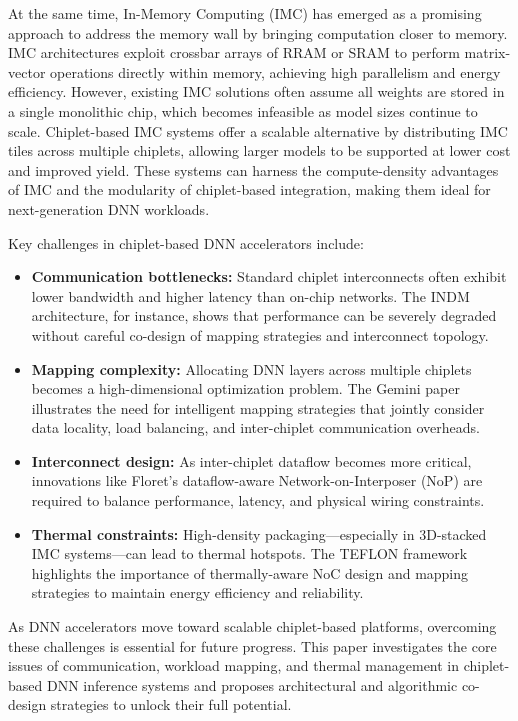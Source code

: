 \documentclass[acmsmall]{acmart}
\begin{document}
At the same time, In-Memory Computing (IMC) has emerged as a promising approach to address the memory wall by bringing computation closer to memory. IMC architectures exploit crossbar arrays of RRAM or SRAM to perform matrix-vector operations directly within memory, achieving high parallelism and energy efficiency. However, existing IMC solutions often assume all weights are stored in a single monolithic chip, which becomes infeasible as model sizes continue to scale. Chiplet-based IMC systems offer a scalable alternative by distributing IMC tiles across multiple chiplets, allowing larger models to be supported at lower cost and improved yield. These systems can harness the compute-density advantages of IMC and the modularity of chiplet-based integration, making them ideal for next-generation DNN workloads.


Key challenges in chiplet-based DNN accelerators include:
\begin{itemize}
    \item \textbf{Communication bottlenecks:} Standard chiplet interconnects often exhibit lower bandwidth and higher latency than on-chip networks. The INDM architecture, for instance, shows that performance can be severely degraded without careful co-design of mapping strategies and interconnect topology.
    \item \textbf{Mapping complexity:} Allocating DNN layers across multiple chiplets becomes a high-dimensional optimization problem. The Gemini paper illustrates the need for intelligent mapping strategies that jointly consider data locality, load balancing, and inter-chiplet communication overheads.
    \item \textbf{Interconnect design:} As inter-chiplet dataflow becomes more critical, innovations like Floret’s dataflow-aware Network-on-Interposer (NoP) are required to balance performance, latency, and physical wiring constraints.
    \item \textbf{Thermal constraints:} High-density packaging—especially in 3D-stacked IMC systems—can lead to thermal hotspots. The TEFLON framework highlights the importance of thermally-aware NoC design and mapping strategies to maintain energy efficiency and reliability.
\end{itemize}

As DNN accelerators move toward scalable chiplet-based platforms, overcoming these challenges is essential for future progress. This paper investigates the core issues of communication, workload mapping, and thermal management in chiplet-based DNN inference systems and proposes architectural and algorithmic co-design strategies to unlock their full potential.
\end{document}

